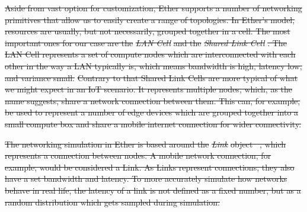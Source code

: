 \documentclass[draft,final]{vutinfth} %
\providecommand{\DIFdeltex}[1]{{\protect\color{red}\sout{#1}}}                      %
\providecommand{\DIFdel}[1]{\texorpdfstring{\DIFdeltex{#1}}{}} %
\begin{document}
\DIFdel{Aside from vast option for customization, Ether supports a number of networking primitives that allow us to easily create a range of topologies.
In Ether's model, resources are usually, but not necessarily, grouped together in a cell.
The most important ones for our case are the }\textit{\DIFdel{LAN Cell}} %
\DIFdel{and the }\textit{\DIFdel{Shared Link Cell}}%
\DIFdel{.
The LAN Cell represents a set of compute nodes which are interconnected with each other in the way a LAN typically is, which means bandwidth is high, latency low, and variance small.}%
\DIFdel{Contrary to that Shared Link Cells are more typical of what we might expect in an IoT scenario. 
It represents multiple nodes, which, as the name suggests, share a network connection between them.
This can, for example, be used to represent a number of edge devices which are grouped together into a small compute box and share a mobile internet connection for wider connectivity.
}%

\DIFdel{The networking simulation in Ether is based around the }\textit{\DIFdel{Link}} %
\DIFdel{object\mbox{%
\cite{rausch-ether}}\hskip0pt%
, which represents a connection between nodes.
A mobile network connection, for example, would be considered a Link.
As Links represent connections, they also have a set bandwidth and latency.
To more accurately simulate how networks behave in real life, the latency of a link is not defined as a fixed number, but as a random distribution which gets sampled during simulation.
}%

\end{document}
